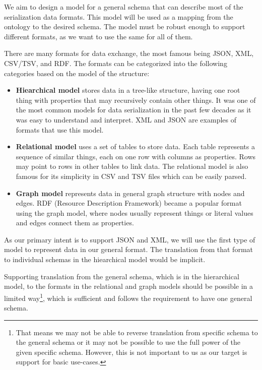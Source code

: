 \smallskip

We aim to design a model for a general schema that can describe most of the serialization data formats. This model will be used as a mapping from the ontology to the desired schema. The model must be robust enough to support different formats, as we want to use the same for all of them.

There are many formats for data exchange, the most famous being JSON, XML, CSV/TSV, and RDF. The formats can be categorized into the following categories based on the model of the structure:
\begin{itemize}
    \item \textbf{Hiearchical model} stores data in a tree-like structure, having one root thing with properties that may recursively contain other things. It was one of the most common models for data serialization in the past few decades as it was easy to understand and interpret. XML and JSON are examples of formats that use this model.
    \item \textbf{Relational model} uses a set of tables to store data. Each table represents a sequence of similar things, each on one row with columns as properties. Rows may point to rows in other tables to link data. The relational model is also famous for its simplicity in CSV and TSV files which can be easily parsed.
    \item \textbf{Graph model} represents data in general graph structure with nodes and edges. RDF (Resource Description Framework) became a popular format using the graph model, where nodes usually represent things or literal values and edges connect them as properties.
\end{itemize}

As our primary intent is to support JSON and XML, we will use the first type of model to represent data in our general format. The translation from that format to individual schemas in the hiearchical model would be implicit.

Supporting translation from the general schema, which is in the hierarchical model, to the formats in the relational and graph models should be possible in a limited way\footnote{That means we may not be able to reverse translation from specific schema to the general schema or it may not be possible to use the full power of the given specific schema. However, this is not important to us as our target is support for basic use-cases.}, which is sufficient and follows the requirement to have one general schema.

